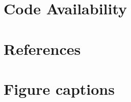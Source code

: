 \documentclass{mynature}
\begin{document}
\section*{Code Availability}

\section*{References}



\section*{Figure captions}



\end{document}
